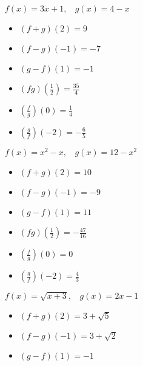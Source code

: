 \documentclass[12pt]{book}
\theoremstyle{definition}
\begin{document}
\begin{oddenumerate}
\item $f(x)=3x+1,~~~~g(x)=4-x$ 
\begin{multicols}{3}
\begin{itemize}
\item  $(f+g)(2)=9$
\item  $(f-g)(-1)=-7$
\item  $(g-f)(1)=-1$
\end{itemize}
\end{multicols}
\begin{multicols}{3}
\begin{itemize}
\item  $(fg)(\frac{1}{2})=\frac{35}{4}$
\item  $\left(\frac{f}{g}\right)(0)=\frac{1}{4}$
\item  $\left(\frac{g}{f}\right)(-2)=-\frac{6}{5}$
\end{itemize}
\end{multicols}
\newpage
\item $f(x)=x^2-x,~~~~g(x)=12-x^2$ 
\begin{multicols}{3}
\begin{itemize}
\item  $(f+g)(2)=10$
\item  $(f-g)(-1)=-9$
\item  $(g-f)(1)=11$
\end{itemize}
\end{multicols}

\begin{multicols}{3}
\begin{itemize}
\item  $(fg)(\frac{1}{2})=-\frac{47}{16}$
\item  $\left(\frac{f}{g}\right)(0)=0$
\item  $\left(\frac{g}{f}\right)(-2)=\frac{4}{3}$
\end{itemize}
\end{multicols}

\item $f(x)=\sqrt{x+3},~~~~g(x)=2x-1$ 
\begin{multicols}{3}
\begin{itemize}
\item  $(f+g)(2)=3+\sqrt{5}$
\item  $(f-g)(-1)=3+\sqrt{2}$
\item  $(g-f)(1)=-1$
\end{itemize}
\end{multicols}


\end{oddenumerate}
\end{document}
